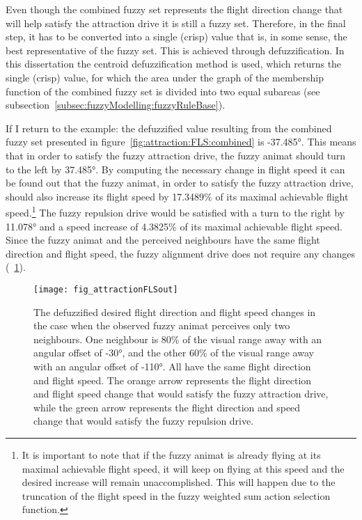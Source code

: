 Even though the combined fuzzy set represents the flight direction change that will help satisfy the attraction drive it is still a fuzzy set. Therefore, in the final step, it has to be converted into a single (crisp) value that is, in some sense, the best representative of the fuzzy set. This is achieved through defuzzification. In this dissertation the centroid defuzzification method is used, which  returns the single (crisp) value, for which the area under the graph of the membership function of the combined fuzzy set is divided into two equal subareas (see subsection~\ref{subsec:fuzzyModelling:fuzzyRuleBase}).

If I return to the example: the defuzzified value resulting from the combined fuzzy set presented in figure~\ref{fig:attraction:FLS:combined} is \ang{-37.485}. This means that in order to satisfy the fuzzy attraction drive, the fuzzy animat should turn to the left by \ang{37.485}. By computing the necessary change in flight speed it can be found out that the fuzzy animat, in order to satisfy the fuzzy attraction drive, should also increase its flight speed by 17.3489\% of its maximal achievable flight speed.\footnote{It is important to note that if the fuzzy animat is already flying at its maximal achievable flight speed, it will keep on flying at this speed and the desired increase will remain unaccomplished. This will happen due to the truncation of the flight speed in the fuzzy weighted sum action selection function.} The fuzzy repulsion drive would be satisfied with a turn to the right by \ang{11.078} and a speed increase of 4.3825\% of its maximal achievable flight speed. Since the fuzzy animat and the perceived neighbours have the same flight direction and flight speed, the fuzzy alignment drive does not require any changes (\fig~\ref{fig:attraction:FLS:output}).

\begin{figure}
  \null\vspace*{.5\gridH}
  \texttt{[image: fig\_attractionFLSout]}
  \vspace*{.5\gridH}
  \caption{The defuzzified desired flight direction and flight speed changes in the case when the observed fuzzy animat perceives only two neighbours. One neighbour is 80\% of the visual range away with an angular offset of \ang{-30}, and the other 60\% of the visual range away with an angular offset of \ang{-110}. All have the same flight direction and flight speed. The orange arrow represents the flight direction and flight speed change that would satisfy the fuzzy attraction drive, while the green arrow represents the flight direction and speed change that would satisfy the fuzzy repulsion drive.}
  \label{fig:attraction:FLS:output}
\end{figure}
